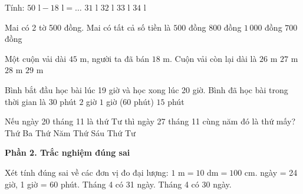 \begin{ex} %
Tính: $50\text{ l} - 18\text{ l} = \dots$
\choice
{$31\text{ l}$}
{\True $32\text{ l}$}
{$33\text{ l}$}
{$34\text{ l}$}
\end{ex}

\begin{ex} %
Mai có 2 tờ 500 đồng. Mai có tất cả số tiền là
\choice
{$500$ đồng}
{$800$ đồng}
{\True $1\,000$ đồng}
{$700$ đồng}
\end{ex}

\begin{ex} %
Một cuộn vải dài $45\text{ m}$, người ta đã bán $18\text{ m}$. Cuộn vải còn lại dài là
\choice
{$26\text{ m}$}
{\True $27\text{ m}$}
{$28\text{ m}$}
{$29\text{ m}$}
\end{ex}

\begin{ex} %
Bình bắt đầu học bài lúc 19 giờ và học xong lúc 20 giờ. Bình đã học bài trong thời gian là
\choice
{$30$ phút}
{$2$ giờ}
{\True $1$ giờ ($60$ phút)}
{$15$ phút}
\end{ex}

\begin{ex} %
Nếu ngày 20 tháng 11 là thứ Tư thì ngày 27 tháng 11 cùng năm đó là thứ mấy?
\choice
{Thứ Ba}
{Thứ Năm}
{Thứ Sáu}
{\True Thứ Tư}
\end{ex}

\textbf{Phần 2. Trắc nghiệm đúng sai}

\begin{ex} %
Xét tính đúng sai về các đơn vị đo đại lượng:
\choiceTF
{\True $1\text{ m} = 10\text{ dm} = 100\text{ cm}$.}
{ ngày = 24 giờ, 1 giờ = 60 phút.}
{Tháng 4 có 31 ngày.}
{\True Tháng 4 có 30 ngày.}
\end{ex}

